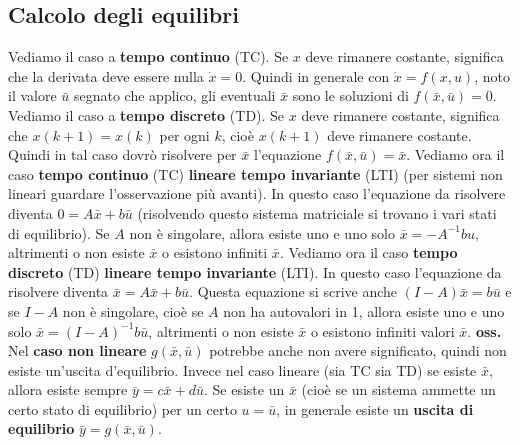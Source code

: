 \subsection{Calcolo degli equilibri}
Vediamo il caso a \textbf{tempo continuo} (TC). Se $x$ deve rimanere costante, significa che la derivata deve essere nulla $\dot{x} = 0$. Quindi in generale con $\dot{x} = f(x,u)$, noto il valore $\bar{u}$ segnato che applico, gli eventuali $\bar{x}$ sono le soluzioni di $f(\bar{x}, \bar{u}) = 0$.\newline
\newline
Vediamo il caso a \textbf{tempo discreto} (TD). Se $x$ deve rimanere costante, significa che $x(k+1) = x(k)$ per ogni $k$, cioè $x(k+1)$ deve rimanere costante. Quindi in tal caso dovrò risolvere per $\bar{x}$ l'equazione $f(\bar{x}, \bar{u}) = \bar{x}$.\newline
\newline
Vediamo ora il caso \textbf{tempo continuo} (TC) \textbf{lineare tempo invariante} (LTI) (per sistemi non lineari guardare l'osservazione più avanti). In questo caso l'equazione da risolvere diventa $0 = A \bar{x} + b \bar{u}$ (risolvendo questo sistema matriciale si trovano i vari stati di equilibrio). Se $A$ non è singolare, allora esiste uno e uno solo $\bar{x} = -A^{-1} b u$, altrimenti o non esiste $\bar{x}$ o esistono infiniti $\bar{x}$.\newline
\newline
Vediamo ora il caso \textbf{tempo discreto} (TD) \textbf{lineare tempo invariante} (LTI). In questo caso l'equazione da risolvere diventa $\bar{x} = A \bar{x} + b \bar{u}$. Questa equazione si scrive anche $(I-A)\bar{x} = b \bar{u}$ e se $I-A$ non è singolare, cioè se $A$ non ha autovalori in 1, allora esiste uno e uno solo $\bar{x} = (I-A)^{-1} b \bar{u}$, altrimenti o non esiste $\bar{x}$ o esistono infiniti valori $\bar{x}$.\newline
\newline
\textbf{oss.} Nel \textbf{caso non lineare} $g(\bar{x}, \bar{u})$ potrebbe anche non avere significato, quindi non esiste un'uscita d'equilibrio. Invece nel caso lineare (sia TC sia TD) se esiste $\bar{x}$, allora esiste sempre $\bar{y} = c \bar{x} + d \bar{u}$.\newline
\newline
Se esiste un $\bar{x}$ (cioè se un sistema ammette un certo stato di equilibrio) per un certo $u = \bar{u}$, in generale esiste un \textbf{uscita di equilibrio} $\bar{y} = g(\bar{x}, \bar{u})$.
